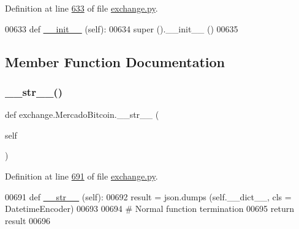 Definition at line \hyperlink{exchange_8py_source_l00633}{633} of file \hyperlink{exchange_8py_source}{exchange.\+py}.


\begin{DoxyCode}
00633     \textcolor{keyword}{def }\hyperlink{namespacestart__time_a9c9bd378729a13c96a22c8b079ea172c}{\_\_init\_\_} (self):
00634         super ().\_\_init\_\_ ()
00635         
\end{DoxyCode}


\subsection{Member Function Documentation}
\mbox{\label{classexchange_1_1_mercado_bitcoin_a42dd78e0cca02c3ab3c185545a879b26}} 
\subsubsection{\texorpdfstring{\+\_\+\+\_\+str\+\_\+\+\_\+()}{\_\_str\_\_()}}
{\footnotesize\ttfamily def exchange.\+Mercado\+Bitcoin.\+\_\+\+\_\+str\+\_\+\+\_\+ (\begin{DoxyParamCaption}\item[{}]{self }\end{DoxyParamCaption})}



Definition at line \hyperlink{exchange_8py_source_l00691}{691} of file \hyperlink{exchange_8py_source}{exchange.\+py}.


\begin{DoxyCode}
00691     \textcolor{keyword}{def }\hyperlink{namespacerates_a2f1a70c33ee9e255938e4c19fd207264}{\_\_str\_\_} (self):
00692         result = json.dumps (self.\_\_dict\_\_, cls = DatetimeEncoder)
00693         
00694         \textcolor{comment}{# Normal function termination}
00695         \textcolor{keywordflow}{return} result
00696         
\end{DoxyCode}
\mbox{\label{classexchange_1_1_mercado_bitcoin_a0d7b9201247f88f3013e83fd8e8012d0}} 
